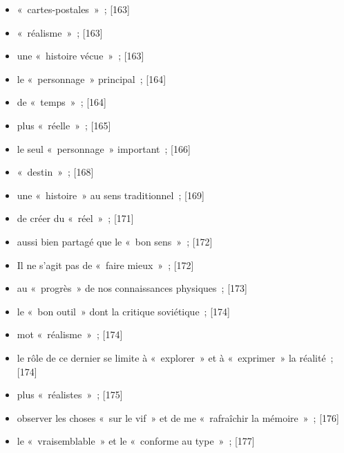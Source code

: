 \documentclass[12pt, a4paper]{article}
\begin{document}
\begin{itemize}
    \item «~cartes-postales~»{\color{gray}~; [163]}

    \item «~réalisme~»{\color{gray}~; [163]}

    \item une «~histoire vécue~»{\color{gray}~; [163]}

    \item le «~personnage~» principal{\color{gray}~; [164]}

    \item de «~temps~»{\color{gray}~; [164]}

    \item plus «~réelle~»{\color{gray}~; [165]}

    \item le seul «~personnage~» important{\color{gray}~; [166]}

    \item «~destin~»{\color{gray}~; [168]}

    \item une «~histoire~» au sens traditionnel{\color{gray}~; [169]}

    \item de créer du «~réel~»{\color{gray}~; [171]}

    \item aussi bien partagé que le «~bon sens~»{\color{gray}~; [172]}

    \item Il ne s’agit pas de «~faire mieux~»{\color{gray}~; [172]}

    \item au «~progrès~» de nos connaissances physiques{\color{gray}~; [173]}

    \item le «~bon outil~» dont la critique soviétique{\color{gray}~; [174]}

    \item mot «~réalisme~»{\color{gray}~; [174]}

    \item le rôle de ce dernier se limite à «~explorer~» et à «~exprimer~» la réalité{\color{gray}~; [174]}

    \item plus «~réalistes~»{\color{gray}~; [175]}

    \item observer les choses «~sur le vif~» et de me «~rafraîchir la mémoire~»{\color{gray}~; [176]}

    \item le «~vraisemblable~» et le «~conforme au type~»{\color{gray}~; [177]}


\end{itemize}
\end{document}
